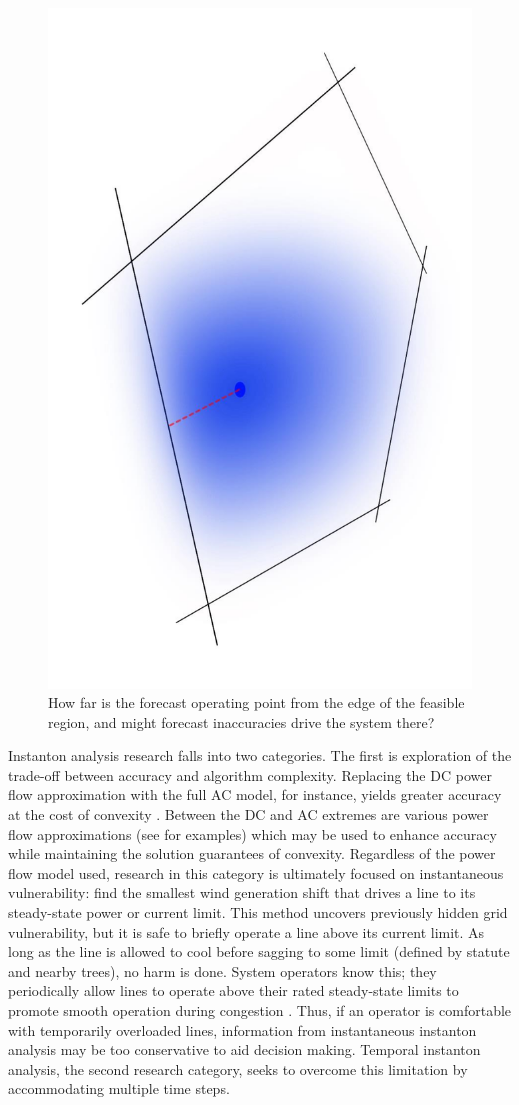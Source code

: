 \documentclass[journal,twoside]{IEEEtran}
\begin{document}
\begin{figure}
\centering
\includegraphics[angle=90,width=0.64\linewidth]{stylizedFeas}
\caption{How far is the forecast operating point from the edge of the feasible region, and might forecast inaccuracies drive the system there?}
\label{fig:stylizedFeas}
\end{figure}


Instanton analysis research falls into two categories. The first is exploration of the trade-off between accuracy and algorithm complexity. Replacing the DC power flow approximation with the full AC model, for instance, yields greater accuracy at the cost of convexity \cite{baghsorkhi2012}. Between the DC and AC extremes are various power flow approximations (see \cite{coffrin2012,hijazi2013,coffrin2014} for examples) which may be used to enhance accuracy while maintaining the solution guarantees of convexity. Regardless of the power flow model used, research in this category is ultimately focused on instantaneous vulnerability: find the smallest wind generation shift that drives a line to its steady-state power or current limit. This method uncovers previously hidden grid vulnerability, but it is safe to briefly operate a line above its current limit. As long as the line is allowed to cool before sagging to some limit (defined by statute and nearby trees), no harm is done. System operators know this; they periodically allow lines to operate above their rated steady-state limits to promote smooth operation during congestion \cite{banakar2005}. Thus, if an operator is comfortable with temporarily overloaded lines, information from instantaneous instanton analysis may be too conservative to aid decision making. Temporal instanton analysis, the second research category, seeks to overcome this limitation by accommodating multiple time steps.
\end{document}
